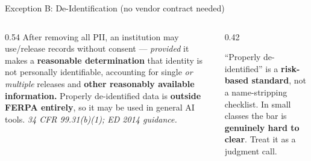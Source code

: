 \documentclass[aspectratio=169, 10pt]{beamer}
\newcommand{\cmcite}[1]{{\scriptsize\color{CoolGray}\textit{#1}}}
\begin{document}
\begin{frame}{Exception B: De-Identification (no vendor contract needed)}
\begin{columns}[T]
\begin{column}{0.54\textwidth}
\small After removing all PII, an institution may use/release records without consent --- \emph{provided} it makes a \textbf{reasonable determination} that identity is not personally identifiable, accounting for single \emph{or multiple} releases and \textbf{other reasonably available information.}
\vskip4pt
Properly de-identified data is \textbf{outside FERPA entirely}, so it may be used in general AI tools.
\vskip4pt
\cmcite{34 CFR 99.31(b)(1); ED 2014 guidance.}
\end{column}
\begin{column}{0.42\textwidth}
\begin{tcolorbox}[coralbox, title={\faExclamationTriangle\quad Say this out loud}]
\small ``Properly de-identified'' is a \textbf{risk-based standard}, not a name-stripping checklist.
\vskip3pt
In small classes the bar is \textbf{genuinely hard to clear}. Treat it as a judgment call.
\end{tcolorbox}
\end{column}
\end{columns}
\end{frame}
\end{document}
